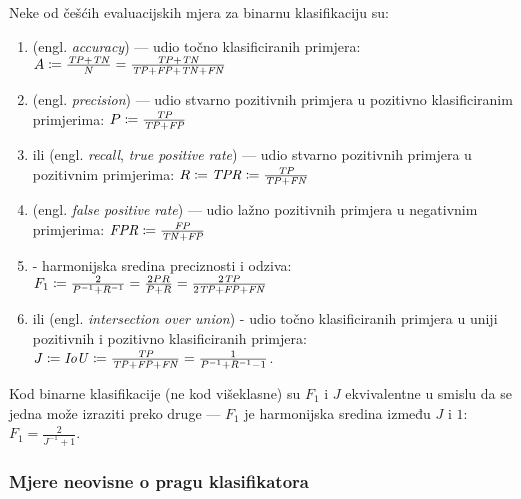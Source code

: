 \documentclass[utf8, diplomski, lmodern]{fer}
\begin{document}
Neke od češćih evaluacijskih mjera za binarnu klasifikaciju su:
\begin{enumerate}[topsep=0pt,itemsep=0pt,partopsep=0pt]
	\item {} (engl. \textit{accuracy}) --- udio točno klasificiranih primjera: $A\coloneqq\frac{\mathit{TP}+\mathit{TN}}{N}=\frac{\mathit{TP}+\mathit{TN}}{\mathit{TP}+\mathit{FP}+\mathit{TN}+\mathit{FN}}$
	\item {} (engl. \textit{precision}) --- udio stvarno pozitivnih primjera u pozitivno klasificiranim primjerima: $P\coloneqq\frac{\mathit{TP}}{\mathit{TP}+\mathit{FP}}$
	\item {} ili  (engl. \textit{recall}, \textit{true positive rate}) --- udio stvarno pozitivnih primjera u pozitivnim primjerima: $R\coloneqq \mathit{TPR}\coloneqq\frac{\mathit{TP}}{\mathit{TP}+\mathit{FN}}$
	\item {} (engl. \textit{false positive rate}) --- udio lažno pozitivnih primjera u negativnim primjerima: $\mathit{FPR}\coloneqq\frac{\mathit{FP}}{\mathit{TN}+\mathit{FP}}$%
	\item {} - harmonijska sredina preciznosti i odziva: $F_1\coloneqq\frac{2}{P^{-1}+R^{-1}}=\frac{2PR}{P+R}=\frac{2\mathit{TP}}{2\mathit{TP}+\mathit{FP}+\mathit{FN}}$
	\item {} ili  (engl. \textit{intersection over union}) - udio točno klasificiranih primjera u uniji pozitivnih i pozitivno klasificiranih primjera: $J\coloneqq\mathit{IoU}\coloneqq\frac{\mathit{TP}}{\mathit{TP}+\mathit{FP}+\mathit{FN}}=\frac{1}{P^{-1}+R^{-1}-1}$.
\end{enumerate}
Kod binarne klasifikacije (ne kod višeklasne) su $F_1$ i $J$ ekvivalentne u smislu da se jedna može izraziti preko druge --- $F_1$ je harmonijska sredina između $J$ i $1$: $F_1=\frac{2}{J^{-1}+1}$.

\subsubsection{Mjere neovisne o pragu klasifikatora}
\end{document}
